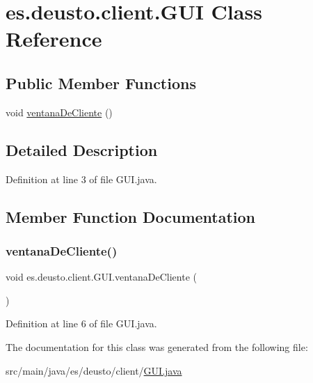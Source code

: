 \hypertarget{classes_1_1deusto_1_1client_1_1_g_u_i}{}\section{es.\+deusto.\+client.\+G\+UI Class Reference}
\label{classes_1_1deusto_1_1client_1_1_g_u_i}
\subsection*{Public Member Functions}
\begin{DoxyCompactItemize}
\item 
void \hyperlink{classes_1_1deusto_1_1client_1_1_g_u_i_a71e596239fe49ac76586cf384aa95920}{ventana\+De\+Cliente} ()
\end{DoxyCompactItemize}


\subsection{Detailed Description}


Definition at line 3 of file G\+U\+I.\+java.



\subsection{Member Function Documentation}
\mbox{\label{classes_1_1deusto_1_1client_1_1_g_u_i_a71e596239fe49ac76586cf384aa95920}} 
\subsubsection{\texorpdfstring{ventana\+De\+Cliente()}{ventanaDeCliente()}}
{\footnotesize\ttfamily void es.\+deusto.\+client.\+G\+U\+I.\+ventana\+De\+Cliente (\begin{DoxyParamCaption}{ }\end{DoxyParamCaption})}



Definition at line 6 of file G\+U\+I.\+java.



The documentation for this class was generated from the following file\+:\begin{DoxyCompactItemize}
\item 
src/main/java/es/deusto/client/\hyperlink{_g_u_i_8java}{G\+U\+I.\+java}\end{DoxyCompactItemize}
